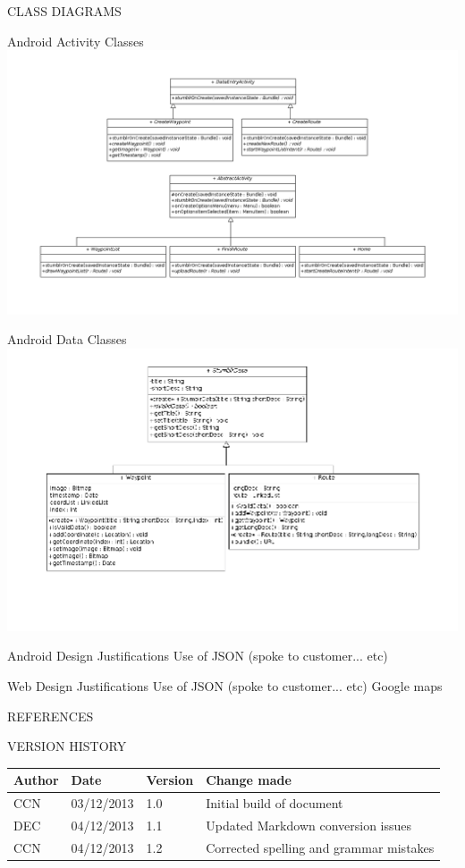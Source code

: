 \documentclass{article}
\newcommand{\versionhistory}{
		\begin{tabularx}{\linewidth}{| p{2cm} | p{2cm} | p{2cm} | X | }
			\hline
			\bf{Author} & \bf{Date} & \bf{Version} & \bf{Change made} \\
			\hline
			CCN & 03/12/2013 & 1.0 & Initial build of document \\
			\hline
			DEC & 04/12/2013 & 1.1 & Updated Markdown conversion issues \\
			\hline
			CCN & 04/12/2013 & 1.2 & Corrected spelling and grammar mistakes \\
			\hline
		\end{tabularx}
}
\begin{document}
	
	\begin{section}{CLASS DIAGRAMS}
		\begin{subsection}{Android Activity Classes}
			\includegraphics[angle=270,width=0.75\columnwidth]{../ClassDiagrams/InterfaceClassDiagram.png}
		\end{subsection}
		
		\clearpage
		\begin{subsection}{Android Data Classes}
			\includegraphics[angle=270,width=0.8\columnwidth]{../ClassDiagrams/DataStructuresClassDiagram.png}
		\end{subsection}
	\end{section}
	
	\begin{section}{Android Design Justifications}
		Use of JSON (spoke to customer... etc)
	\end{section}
	
	\begin{section}{Web Design Justifications}
		Use of JSON (spoke to customer... etc)
		Google maps		
	\end{section}

	\nocite{LaTeXTemplate} %
	\nocite{LaTeXListings}
	\nocite{LaTeXListings2}
	\nocite{LaTeXListings3}

	\newpage
	\begin{section}{REFERENCES}
		
		
	\end{section}
	
	\vspace{1cm}
	\begin{section}{VERSION HISTORY}
		\versionhistory
	\end{section}
\end{document}
